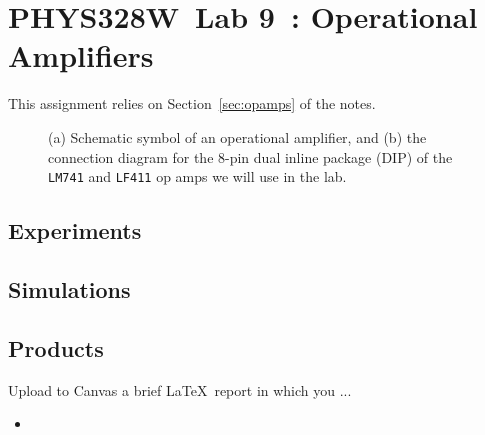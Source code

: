 \documentclass[11pt]{article}
\newcommand{\COURSE}{PHYS328W}
\newcommand{\LABNUM}{9}
\newcommand{\TITLE}{Operational Amplifiers}
\begin{document}
\thispagestyle{empty}

\section*{\COURSE\ Lab \LABNUM\ : \TITLE}

This assignment relies on Section~\ref{sec:opamps} of the notes.

\begin{figure}[ht]
  \begin{center}
    \caption{(a) Schematic symbol of an operational amplifier, and
      (b) the connection diagram for the 8-pin dual inline package
      (DIP) of the \texttt{LM741} and \texttt{LF411} op amps we will
      use in the lab.}
    \label{fig:opamp}
  \end{center}
\end{figure}

\subsection*{Experiments}


\subsection*{Simulations}


\subsection*{Products}

Upload to Canvas a brief \LaTeX\ report in which you ...
\begin{itemize}
\item 
\end{itemize}
\end{document}

